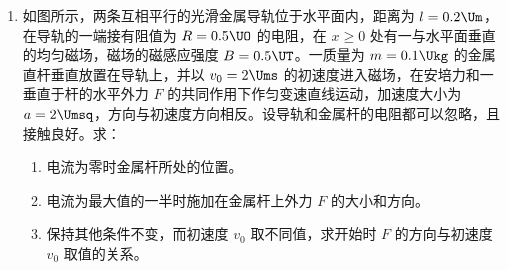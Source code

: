 \documentclass[\gkver]{gaokaozhenti}
\begin{document}
\begin{enumerate}
{$FR_{1}=Tr_{1}$ ①

对后轮的轴，由力矩平衡得：

$Tr_{2}=f_{s}R_{2}$ ②

（2）由上两式及 $f_{s}=f$ ③

可得 $\frac{FR_{1}}{f_{s}R_{2}}=\frac{r_{1}}{r_{2}}=\frac{48}{24}$ ④

解得 $\frac{F}{f}=\frac{r_{1}R_{2}}{r_{2}R_{1}}=\frac{48\times33}{24\times20}=3.3$ ⑤

（3）杠杆示意图如图所示。

\onepicture[h=4.19cm]{}
}

\item
如图所示，两条互相平行的光滑金属导轨位于水平面内，距离为 $l=0.2\Um$，在导轨的一端接有阻值为 $R=0.5\UO$ 的电阻，在 $x\geq0$ 处有一与水平面垂直的均匀磁场，磁场的磁感应强度 $B=0.5\UT$。一质量为 $m=0.1\Ukg$ 的金属直杆垂直放置在导轨上，并以 $v_{0}=2\Ums$ 的初速度进入磁场，在安培力和一垂直于杆的水平外力 $F$ 的共同作用下作匀变速直线运动，加速度大小为 $a=2\Umsq$，方向与初速度方向相反。设导轨和金属杆的电阻都可以忽略，且接触良好。求：

\begin{enumerate}
\item
电流为零时金属杆所处的位置。
\item
电流为最大值的一半时施加在金属杆上外力 $F$ 的大小和方向。
\item
保持其他条件不变，而初速度 $v_{0}$ 取不同值，求开始时 $F$ 的方向与初速度 $v_{0}$ 取值的关系。
\end{enumerate}

\onepicture[align=right, w=6.43cm]{}


\end{enumerate}
\end{document}
